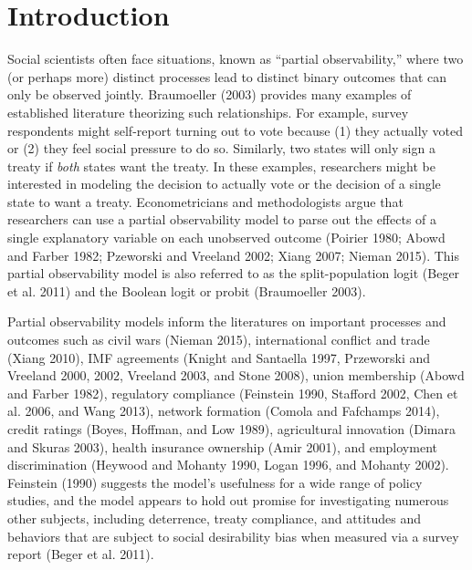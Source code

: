 \documentclass[10pt]{article}
\begin{document}
\vspace{10mm}
\begin{center}
\end{center}

\thispagestyle{empty}

\newpage
\doublespace

\section*{Introduction}

Social scientists often face situations, known as ``partial observability,'' where two (or perhaps more) distinct processes lead to distinct binary outcomes that can only be observed jointly. 
Braumoeller (2003) provides many examples of established literature theorizing such relationships. 
For example, survey respondents might self-report turning out to vote because (1) they actually voted or (2) they feel social pressure to do so. 
Similarly, two states will only sign a treaty if \textit{both} states want the treaty. 
In these examples, researchers might be interested in modeling the decision to actually vote or the decision of a single state to want a treaty. 
Econometricians and methodologists argue that researchers can use a partial observability model to parse out the effects of a single explanatory variable on each unobserved outcome (Poirier 1980; Abowd and Farber 1982; Pzeworski and Vreeland 2002; Xiang 2007; Nieman 2015).
This partial observability model is also referred to as the split-population logit (Beger et al. 2011) and the Boolean logit or probit (Braumoeller 2003).

Partial observability models inform the literatures on important processes and outcomes such as civil wars (Nieman 2015), international conflict and trade (Xiang 2010), IMF agreements (Knight and Santaella 1997, Przeworski and Vreeland 2000, 2002, Vreeland 2003, and Stone 2008), union membership (Abowd and Farber 1982), regulatory compliance (Feinstein 1990, Stafford 2002, Chen et al. 2006, and Wang 2013), network formation (Comola and Fafchamps 2014), credit ratings (Boyes, Hoffman, and Low 1989), agricultural innovation (Dimara and Skuras 2003), health insurance ownership (Amir 2001), and employment discrimination (Heywood and Mohanty 1990, Logan 1996, and Mohanty 2002). 
Feinstein (1990) suggests the model's usefulness for a wide range of policy studies, and the model appears to hold out promise for investigating numerous other subjects, including deterrence, treaty compliance, and attitudes and behaviors that are subject to social desirability bias when measured via a survey report (Beger et al. 2011). 
\end{document}

